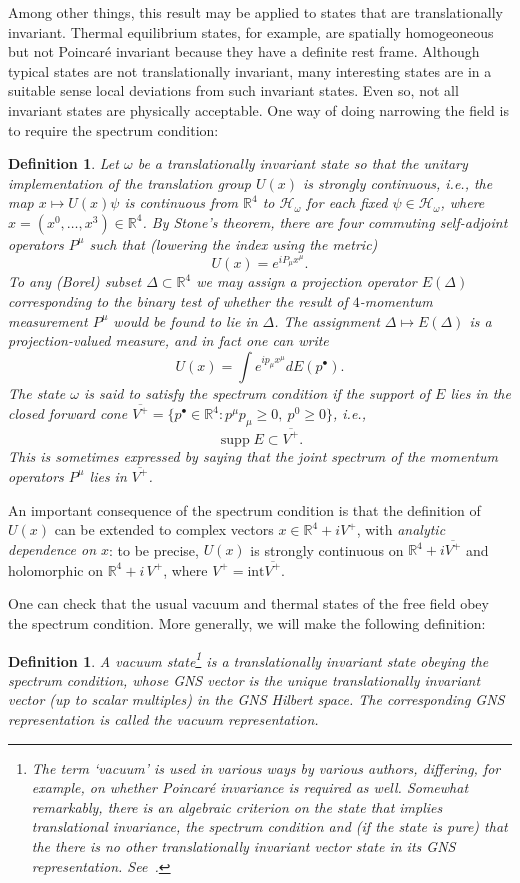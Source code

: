 \documentclass[12pt,a4paper]{article}
\newcommand{\1}{\mathds{1}}                         %
\newcommand{\RR}{\mathbb{R}}           %
\newcommand{\HH}{{\mathcal{H}}}
\newtheorem{definition}[theorem]{Definition}
\DeclareMathOperator{\supp}{supp}
\begin{document}
Among other things, this result may be applied to states that are   translationally invariant. Thermal equilibrium states, for example, are spatially homogeoneous but not Poincar\'e invariant because they have a definite rest frame. Although typical states are not translationally invariant, many interesting states are in a suitable sense local deviations from such invariant states. Even so, not all invariant states are physically acceptable. One way of doing narrowing the field is to require the spectrum condition:
\begin{definition}
	Let $\omega$ be a translationally invariant state so that the unitary implementation of the translation group $U(x)$ is \emph{strongly continuous}, i.e., the map $x\mapsto U(x)\psi$ is continuous from $\RR^4$ to $\HH_\omega$ for each fixed $\psi\in\HH_\omega$, where $x=(x^0,\ldots,x^3)\in\RR^4$.
	By Stone's theorem, there are four commuting self-adjoint operators $P^\mu$ such that 
	(lowering the index using the metric)
	\[
	U(x) = e^{iP_\mu x^\mu}.
	\]
	To any (Borel) subset $\Delta\subset \RR^4$ we may assign a projection operator $E(\Delta)$
	corresponding to the binary test of whether the result of $4$-momentum measurement $P^\mu$ would be found to lie in $\Delta$. The assignment $\Delta\mapsto E(\Delta)$ is a \emph{projection-valued measure}, and in fact one can write 
	\[
	U(x) = \int e^{ip_\mu x^\mu}dE(p^\bullet).
	\]
	The state $\omega$ is said to satisfy the \emph{spectrum condition} if the support of $E$ lies in the \emph{closed forward cone} $\overline{V^+}=\{p^\bullet\in\RR^4: p^\mu p_\mu\ge 0,~p^0\ge 0\}$, i.e.,
	\[
	\supp E \subset \overline{V^+}.
	\]
	This is sometimes expressed by saying that the joint spectrum of the momentum operators $P^\mu$ lies in $\overline{V^+}$. 
\end{definition}	 
An important consequence of the spectrum condition is that the definition of $U(x)$ can be extended to complex vectors $x\in \RR^4+iV^+$, with \emph{analytic dependence on $x$}: to be precise, $U(x)$ is strongly continuous on $\RR^4+i\overline{V^+}$ and holomorphic on $\RR^4+i\,V^+$, where $V^+=\text{int} \overline{V^+}$.  

One can check that the usual vacuum and thermal states of the free field obey the spectrum condition. More generally, we will make the following definition:
\begin{definition}\label{def:vacuum}
	A \emph{vacuum state}\footnote{The term `vacuum' is used in various ways by various authors, differing, for example, on whether Poincar\'e invariance is required as well. Somewhat remarkably, there is an algebraic criterion on the state that implies translational invariance, the spectrum condition and (if the state is pure) that the there is no other translationally invariant vector state in its GNS representation. See~\cite{Araki}.} is a translationally invariant state obeying the spectrum condition, whose GNS vector is the unique translationally invariant vector (up to scalar multiples) in the GNS Hilbert space. The corresponding GNS representation is called the \emph{vacuum representation.}
\end{definition}
\end{document}
